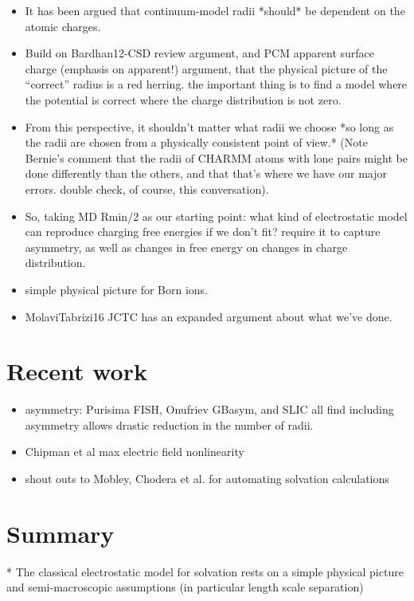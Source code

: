 \documentclass[reprint, letterpaper, nobibnotes, aps, superscriptaddress,prb]{revtex4-1}
\begin{document}
\begin{itemize}
\item It has been argued that continuum-model radii *should* be
  dependent on the atomic charges.
\item Build on Bardhan12-CSD review argument, and PCM apparent surface
  charge (emphasis on apparent!) argument, that the physical picture
  of the ``correct'' radius is a red herring.  the important thing is
  to find a model where the potential is correct where the charge
  distribution is not zero.
\item From this perspective, it shouldn't matter what radii we choose
  *so long as the radii are chosen from a physically consistent point
  of view.* (Note Bernie's comment that the radii of CHARMM atoms with
  lone pairs might be done differently than the others, and that
  that's where we have our major errors. double check, of course, this
  conversation).
\item So, taking MD Rmin/2 as our starting point: what kind of
  electrostatic model can reproduce charging free energies if we don't
  fit?  require it to capture asymmetry, as well as changes in free
  energy on changes in charge distribution.
\item simple physical picture for Born ions.
\item MolaviTabrizi16 JCTC has an expanded argument about what we've done.  
\end{itemize}

\section{Recent work}
\begin{itemize}
\item asymmetry: Purisima FISH, Onufriev GBasym, and SLIC all find including asymmetry allows drastic reduction in the number of radii.
\item Chipman et al max electric field nonlinearity
\item shout outs to Mobley, Chodera et al. for automating solvation calculations
\end{itemize}

\section{Summary}

* The classical electrostatic model for solvation rests on a simple physical picture and semi-macroscopic assumptions (in particular length scale separation)
\end{document}
